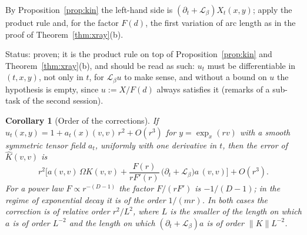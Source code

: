 \documentclass[11pt,a4paper]{article}
\makeatletter
\theoremstyle{stmt}
\newtheorem{corollary}[theorem]{Corollary}
\theoremstyle{defn}
\theoremstyle{rmk}
\renewenvironment{proof}[1][\proofname]{\par\pushQED{\qed}\normalfont\topsep6\p@\@plus6\p@\relax
  \trivlist\item[\hskip\labelsep{\sffamily\itshape\small #1.}]\ignorespaces}{\popQED\endtrivlist\@endpefalse}
\numberwithin{equation}{section}
\newcommand{\Lie}{\mathcal{L}}
\newcommand{\status}[1]{\par\noindent\textsf{\small Status: #1}\par}
\makeatother
\begin{document}
{\begin{proof}
By Proposition~\ref{prop:kin} the left-hand side is $(\partial_t+\Lie_\beta)X_t(x,y)$; apply the product rule and, for the factor $F(d)$, the first variation of arc length as in the proof of Theorem~\ref{thm:xray}(b).
\end{proof}
\status{proven; it is the product rule on top of Proposition~\ref{prop:kin} and Theorem~\ref{thm:xray}(b), and should be read as such: $u_t$ must be differentiable in $(t,x,y)$, not only in $t$, for $\Lie_\beta u$ to make sense, and without a bound on $u$ the hypothesis is empty, since $u:=X/F(d)$ always satisfies it (remarks of a sub-task of the second session).}

\begin{corollary}[Order of the corrections]\label{cor:prefactor}
If $u_t(x,y)=1+a_t(x)(v,v)\,r^2+O(r^3)$ for $y=\exp_x(rv)$ with a smooth symmetric tensor field $a_t$, uniformly with one derivative in $t$, then the error of $\hat K(v,v)$ is
\[
r^2\Big[a(v,v)\,\Omega K(v,v)+\frac{F(r)}{rF'(r)}\,\big(\partial_t+\Lie_\beta\big)a\,(v,v)\Big]+O(r^3) .
\]
For a power law $F\propto r^{-(D-1)}$ the factor $F/(rF')$ is $-1/(D-1)$; in the regime of exponential decay it is of the order $1/(mr)$. In both cases the correction is of relative order $r^2/L^2$, where $L$ is the smaller of the length on which $a$ is of order $L^{-2}$ and the length on which $(\partial_t+\Lie_\beta)a$ is of order $\|K\|L^{-2}$.
\end{corollary}
}
\end{document}
